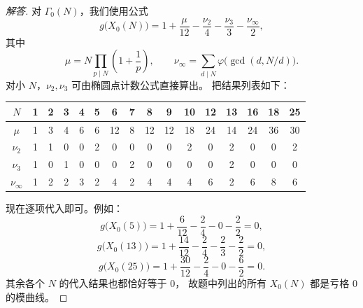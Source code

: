 \begin{proof}[解答]
对 $\Gamma_0(N)$，我们使用公式
\[
  g\bigl(X_0(N)\bigr)=1+\frac{\mu}{12}-\frac{\nu_2}{4}-\frac{\nu_3}{3}-\frac{\nu_\infty}{2},
\]
其中
\[
  \mu=N\prod_{p\mid N}\left(1+\frac1p\right),
  \qquad
  \nu_\infty=\sum_{d\mid N}\varphi\bigl(\gcd(d,N/d)\bigr).
\]
对小 $N$，$\nu_2,\nu_3$ 可由椭圆点计数公式直接算出。
把结果列表如下：

\begin{center}
\begin{tabular}{c|ccccccccccccccc}
$N$ & 1 & 2 & 3 & 4 & 5 & 6 & 7 & 8 & 9 & 10 & 12 & 13 & 16 & 18 & 25 \\
\midrule
$\mu$ & 1 & 3 & 4 & 6 & 6 & 12 & 8 & 12 & 12 & 18 & 24 & 14 & 24 & 36 & 30 \\
$\nu_2$ & 1 & 1 & 0 & 0 & 2 & 0 & 0 & 0 & 0 & 2 & 0 & 2 & 0 & 0 & 2 \\
$\nu_3$ & 1 & 0 & 1 & 0 & 0 & 0 & 2 & 0 & 0 & 0 & 0 & 2 & 0 & 0 & 0 \\
$\nu_\infty$ & 1 & 2 & 2 & 3 & 2 & 4 & 2 & 4 & 4 & 4 & 6 & 2 & 6 & 8 & 6
\end{tabular}
\end{center}

现在逐项代入即可。例如：
\[
  g\bigl(X_0(5)\bigr)=1+\frac{6}{12}-\frac24-0-\frac22=0,
\]
\[
  g\bigl(X_0(13)\bigr)=1+\frac{14}{12}-\frac24-\frac23-\frac22=0,
\]
\[
  g\bigl(X_0(25)\bigr)=1+\frac{30}{12}-\frac24-0-\frac62=0.
\]
其余各个 $N$ 的代入结果也都恰好等于 $0$，
故题中列出的所有 $X_0(N)$ 都是亏格 $0$ 的模曲线。
\end{proof}
